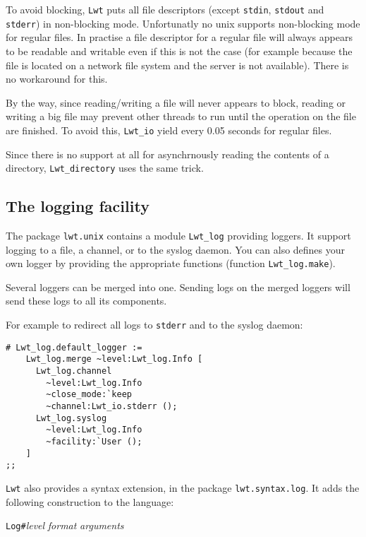 \documentclass{article}
\newcommand{\lwt}{\texttt{Lwt}\xspace}
\begin{document}
To avoid blocking, \lwt puts all file descriptors (except
\texttt{stdin}, \texttt{stdout} and \texttt{stderr}) in non-blocking
mode. Unfortunatly no unix supports non-blocking mode for regular
files. In practise a file descriptor for a regular file will always
appears to be readable and writable even if this is not the case (for
example because the file is located on a network file system and the
server is not available). There is no workaround for this.

By the way, since reading/writing a file will never appears to block,
reading or writing a big file may prevent other threads to run until
the operation on the file are finished. To avoid this,
\texttt{Lwt\_io} yield every 0.05 seconds for regular files.

Since there is no support at all for asynchrnously reading the
contents of a directory, \texttt{Lwt\_directory} uses the same trick.

\subsection{The logging facility}
\label{lwt.log}

The package \texttt{lwt.unix} contains a module \texttt{Lwt\_log}
providing loggers. It support logging to a file, a channel, or to the
syslog daemon. You can also defines your own logger by providing the
appropriate functions (function \texttt{Lwt\_log.make}).

Several loggers can be merged into one. Sending logs on the merged
loggers will send these logs to all its components.

For example to redirect all logs to \texttt{stderr} and to the syslog
daemon:

\begin{verbatim}
# Lwt_log.default_logger :=
    Lwt_log.merge ~level:Lwt_log.Info [
      Lwt_log.channel
        ~level:Lwt_log.Info
        ~close_mode:`keep
        ~channel:Lwt_io.stderr ();
      Lwt_log.syslog
        ~level:Lwt_log.Info
        ~facility:`User ();
    ]
;;
\end{verbatim}

\lwt also provides a syntax extension, in the package
\texttt{lwt.syntax.log}. It adds the following construction to the
language:

\begin{center}
  \texttt{Log\#}\textit{level} \textit{format} \textit{arguments}
\end{center}
\end{document}
